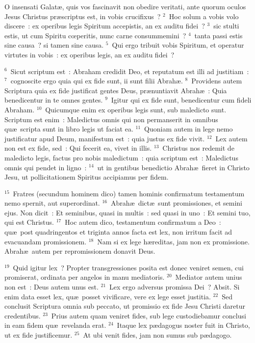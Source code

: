 \bchapter
\lettrine[lines=3,image=true,loversize=0.05,lraise=-0.03]{O}{} insensati Galat\ae , quis vos fascinavit non obedire veritati, ante quorum oculos Jesus Christus pr\ae scriptus est, in vobis crucifixus~?
${}^{2}$~Hoc solum a vobis volo discere~: ex operibus legis Spiritum accepistis, an ex auditu fidei~?
${}^{3}$~sic stulti estis, ut cum Spiritu cœperitis, nunc carne consummemini~?
${}^{4}$~tanta passi estis sine causa~? si tamen sine causa.
${}^{5}$~Qui ergo tribuit vobis Spiritum, et operatur virtutes in vobis~: ex operibus legis, an ex auditu fidei~?


${}^{6}$~Sicut scriptum est~: Abraham credidit Deo, et reputatum est illi ad justitiam~:
${}^{7}$~cognoscite ergo quia qui ex fide sunt, ii sunt filii Abrah\ae .
${}^{8}$~Providens autem Scriptura quia ex fide justificat gentes Deus, pr\ae nuntiavit Abrah\ae~: Quia benedicentur in te omnes gentes.
${}^{9}$~Igitur qui ex fide sunt, benedicentur cum fideli Abraham.
${}^{10}$~Quicumque enim ex operibus legis sunt, sub maledicto sunt. Scriptum est enim~: Maledictus omnis qui non permanserit in omnibus qu\ae\ scripta sunt in libro legis ut faciat ea.
${}^{11}$~Quoniam autem in lege nemo justificatur apud Deum, manifestum est~: quia justus ex fide vivit.
${}^{12}$~Lex autem non est ex fide, sed~: Qui fecerit ea, vivet in illis.
${}^{13}$~Christus nos redemit de maledicto legis, factus pro nobis maledictum~: quia scriptum est~: Maledictus omnis qui pendet in ligno~:
${}^{14}$~ut in gentibus benedictio Abrah\ae\ fieret in Christo Jesu, ut pollicitationem Spiritus accipiamus per fidem.


${}^{15}$~Fratres (secundum hominem dico) tamen hominis confirmatum testamentum nemo spernit, aut superordinat.
${}^{16}$~Abrah\ae\ dict\ae\ sunt promissiones, et semini ejus. Non dicit~: Et seminibus, quasi in multis~: sed quasi in uno~: Et semini tuo, qui est Christus.
${}^{17}$~Hoc autem dico, testamentum confirmatum a Deo~: qu\ae\ post quadringentos et triginta annos facta est lex, non irritum facit ad evacuandam promissionem.
${}^{18}$~Nam si ex lege h\ae reditas, jam non ex promissione. Abrah\ae\ autem per repromissionem donavit Deus.


${}^{19}$~Quid igitur lex~? Propter transgressiones posita est donec veniret semen, cui promiserat, ordinata per angelos in manu mediatoris.
${}^{20}$~Mediator autem unius non est~: Deus autem unus est.
${}^{21}$~Lex ergo adversus promissa Dei~? Absit. Si enim data esset lex, qu\ae\ posset vivificare, vere ex lege esset justitia.
${}^{22}$~Sed conclusit Scriptura omnia sub peccato, ut promissio ex fide Jesu Christi daretur credentibus.
${}^{23}$~Prius autem quam veniret fides, sub lege custodiebamur conclusi in eam fidem qu\ae\ revelanda erat.
${}^{24}$~Itaque lex p\ae dagogus noster fuit in Christo, ut ex fide justificemur.
${}^{25}$~At ubi venit fides, jam non sumus sub p\ae dagogo.


